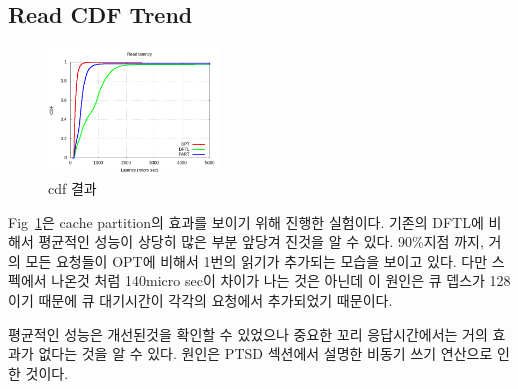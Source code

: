 \documentclass[conference]{IEEEtran}
\begin{document}
\subsection{Read CDF Trend}
\begin{figure}[h]
	\centering
	\includegraphics[width=0.4\textwidth]{image/EVAL/cdf.png}
	\caption{cdf 결과}
	\label{fig:cdf1}
\end{figure}
Fig~\ref{fig:cdf1}은 cache partition의 효과를 보이기 위해 진행한 실험이다. 기존의 DFTL에 비해서 평균적인 성능이 상당히 많은 부분 앞당겨 진것을 알 수 있다. 90\%지점 까지, 거의 모든 요청들이 OPT에 비해서 1번의 읽기가 추가되는 모습을 보이고 있다. 다만 스펙에서 나온것 처럼 140micro sec이 차이가 나는 것은 아닌데 이 원인은 큐 뎁스가 128이기 때문에 큐 대기시간이 각각의 요청에서 추가되었기 때문이다. \par
평균적인 성능은 개선된것을 확인할 수 있었으나 중요한 꼬리 응답시간에서는 거의 효과가 없다는 것을 알 수 있다. 원인은 PTSD 섹션에서 설명한 비동기 쓰기 연산으로 인한 것이다.\par
\end{document}
